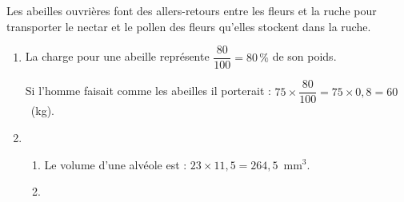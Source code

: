 
\medskip

Les abeilles ouvrières font des allers-retours entre les fleurs et la ruche pour transporter le nectar et le pollen des fleurs qu'elles stockent dans la ruche.

\medskip

\begin{enumerate}
\item %
La charge pour une abeille représente $\dfrac{80}{100} = 80\,\%$ de son poids.

Si l'homme faisait comme les abeilles il porterait : $75 \times \dfrac{80}{100} = 75 \times 0,8 = 60$~(kg).
\item %

	\begin{enumerate}
		\item %
Le volume d'une alvéole est : $23 \times 11,5 = 264,5$~mm$^3$.	

%

		\item %


\end{enumerate}
\end{enumerate}
